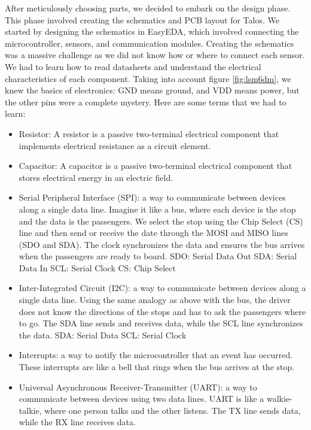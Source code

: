 \documentclass{article}
\begin{document}
After meticulously choosing parts, we decided to embark on the design phase. This phase involved creating the schematics and PCB layout for Talos. We started by designing the schematics in EasyEDA, which involved connecting the microcontroller, sensors, and communication modules. Creating the schematics was a massive challenge as we did not know how or where to connect each sensor. We had to learn how to read datasheets and understand the electrical characteristics of each component. Taking into account figure \ref{fig:lsm6dm}, we knew the basics of electronics: GND means ground, and VDD means power, but the other pins were a complete mystery. Here are some terms that we had to learn:
\begin{itemize}
      \item Resistor: A resistor is a passive two-terminal electrical component that implements electrical resistance as a circuit element.
      \item Capacitor: A capacitor is a passive two-terminal electrical component that stores electrical energy in an electric field.
      \item Serial Peripheral Interface (SPI): a way to communicate between devices along a single data line. Imagine it like a bus, where each device is the stop and the data is the passengers. We select the stop using the Chip Select (CS) line and then send or receive the date through the MOSI and MISO lines (SDO and SDA). The clock synchronizes the data and ensures the bus arrives when the passengers are ready to board.
            \subitem SDO: Serial Data Out
            \subitem SDA: Serial Data In
            \subitem SCL: Serial Clock
            \subitem CS: Chip Select
      \item Inter-Integrated Circuit (I2C): a way to communicate between devices along a single data line. Using the same analogy as above with the bus, the driver does not know the directions of the stops and has to ask the passengers where to go. The SDA line sends and receives data, while the SCL line synchronizes the data.
            \subitem SDA: Serial Data
            \subitem SCL: Serial Clock
      \item Interrupts: a way to notify the microcontroller that an event has occurred. These interrupts are like a bell that rings when the bus arrives at the stop.
      \item Universal Asynchronous Receiver-Transmitter (UART): a way to communicate between devices using two data lines. UART is like a walkie-talkie, where one person talks and the other listens. The TX line sends data, while the RX line receives data.

\end{itemize}
\end{document}

